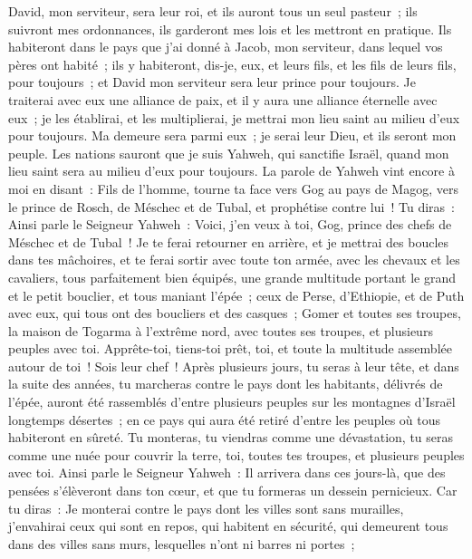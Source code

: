 \begin{multicols}{2}
David, mon serviteur, sera leur roi, et ils auront tous un seul pasteur~; ils suivront mes ordonnances, ils garderont mes lois et les mettront en pratique.
Ils habiteront dans le pays que j'ai donné à Jacob, mon serviteur, dans lequel vos pères ont habité~; ils y habiteront, dis-je, eux, et leurs fils, et les fils de leurs fils, pour toujours~; et David mon serviteur sera leur prince pour toujours.
Je traiterai avec eux une alliance de paix, et il y aura une alliance éternelle avec eux~; je les établirai, et les multiplierai, je mettrai mon lieu saint au milieu d'eux pour toujours.
Ma demeure sera parmi eux~; je serai leur Dieu, et ils seront mon peuple.
Les nations sauront que je suis Yahweh, qui sanctifie Israël, quand mon lieu saint sera au milieu d'eux pour toujours.
\VerseOne{}La parole de Yahweh vint encore à moi en disant~:
Fils de l'homme, tourne ta face vers Gog au pays de Magog, vers le prince de Rosch, de Méschec et de Tubal, et prophétise contre lui~!
Tu diras~: Ainsi parle le Seigneur Yahweh~: Voici, j'en veux à toi, Gog, prince des chefs de Méschec et de Tubal~!
Je te ferai retourner en arrière, et je mettrai des boucles dans tes mâchoires, et te ferai sortir avec toute ton armée, avec les chevaux et les cavaliers, tous parfaitement bien équipés, une grande multitude portant le grand et le petit bouclier, et tous maniant l'épée~;
ceux de Perse, d'Ethiopie, et de Puth avec eux, qui tous ont des boucliers et des casques~;
Gomer et toutes ses troupes, la maison de Togarma à l'extrême nord, avec toutes ses troupes, et plusieurs peuples avec toi.
Apprête-toi, tiens-toi prêt, toi, et toute la multitude assemblée autour de toi~! Sois leur chef~!
Après plusieurs jours, tu seras à leur tête, et dans la suite des années, tu marcheras contre le pays dont les habitants, délivrés de l'épée, auront été rassemblés d'entre plusieurs peuples sur les montagnes d'Israël longtemps désertes~; en ce pays qui aura été retiré d'entre les peuples où tous habiteront en sûreté.
Tu monteras, tu viendras comme une dévastation, tu seras comme une nuée pour couvrir la terre, toi, toutes tes troupes, et plusieurs peuples avec toi.
Ainsi parle le Seigneur Yahweh~: Il arrivera dans ces jours-là, que des pensées s'élèveront dans ton cœur, et que tu formeras un dessein pernicieux.
Car tu diras~: Je monterai contre le pays dont les villes sont sans murailles, j'envahirai ceux qui sont en repos, qui habitent en sécurité, qui demeurent tous dans des villes sans murs, lesquelles n'ont ni barres ni portes~;

\end{multicols}
